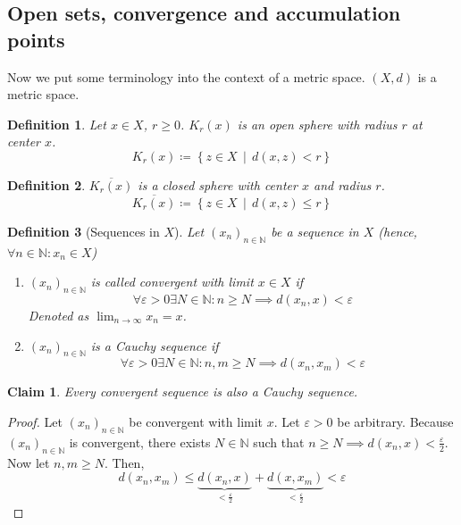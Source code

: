 \documentclass{article}
\newtheorem{definition}{Definition}  \numberwithin{definition}{section}
\newtheorem*{claim}{Claim}%
\newcommand{\setdef}[2]{\left\{\left.#1\,\middle|\,#2\right.\right\}}
\begin{document}
\subsection{Open sets, convergence and accumulation points}

Now we put some terminology into the context of a metric space.
$(X, d)$ is a metric space.

\begin{definition}
  Let $x \in X$, $r \geq 0$.
  $K_r(x)$ is an \emph{open sphere} with radius $r$ at center $x$.
  \[ K_r(x) \coloneqq \setdef{z \in X}{d(x, z) < r} \]
\end{definition}

\begin{definition} $\overline{K_r(x)}$ is a closed sphere with center $x$ and radius $r$.
  \[ \overline{K_r(x)} \coloneqq \setdef{z \in X}{d(x, z) \leq r} \]
\end{definition}

\begin{definition}[Sequences in $X$]
  Let $(x_n)_{n\in\mathbb N}$ be a sequence in $X$ (hence, $\forall n \in \mathbb N: x_n \in X$)
  \begin{enumerate}
    \item $(x_n)_{n\in\mathbb N}$ is called \emph{convergent} with limit $x \in X$ if
      \[ \forall \varepsilon > 0 \exists N \in \mathbb N: n \geq N \implies d(x_n, x) < \varepsilon \]
      Denoted as $\lim_{n\to\infty} x_n = x$.
    \item $(x_n)_{n\in\mathbb N}$ is a Cauchy sequence if
      \[ \forall \varepsilon > 0 \exists N \in \mathbb N: n, m \geq N \implies d(x_n, x_m) < \varepsilon \]
  \end{enumerate}
\end{definition}

\begin{claim}
  Every convergent sequence is also a Cauchy sequence.
\end{claim}

\begin{proof}
  Let $(x_n)_{n\in\mathbb N}$ be convergent with limit $x$. Let $\varepsilon > 0$ be arbitrary.
  Because $(x_n)_{n\in\mathbb N}$ is convergent, there exists $N \in \mathbb N$ such that $n \geq N \implies d(x_n, x) < \frac{\varepsilon}{2}$.
  Now let $n,m \geq N$. Then,
  \[ d(x_n, x_m) \leq \underbrace{d(x_n, x)}_{< \frac{\varepsilon}2} + \underbrace{d(x, x_m)}_{< \frac\varepsilon2} < \varepsilon \]
\end{proof}
\end{document}
